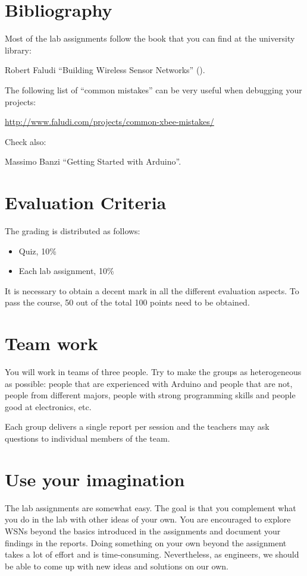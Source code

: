 \section{Bibliography}

Most of the lab assignments follow the book that you can find at the university library:

Robert Faludi ``Building Wireless Sensor Networks'' (\cite{faludi2010bws}).

The following list of ``common mistakes'' can be very useful when debugging your projects:

\url{http://www.faludi.com/projects/common-xbee-mistakes/}

Check also:

Massimo Banzi ``Getting Started with Arduino''.

\section{Evaluation Criteria}

The grading is distributed as follows:
\begin{itemize}
\item Quiz, 10\%
\item Each lab assignment, 10\%
\end{itemize}

It is necessary to obtain a decent mark in all the different evaluation aspects.
To pass the course, 50 out of the total 100 points need to be obtained.

\section{Team work}

You will work in teams of three people.
Try to make the groups as heterogeneous as possible: people that are experienced with Arduino and people that are not, people from different majors, people with strong programming skills and people good at electronics, etc.

Each group delivers a single report per session and the teachers may ask questions to individual members of the team.

\section{Use your imagination}
The lab assignments are somewhat easy.
The goal is that you complement what you do in the lab with other ideas of your own.
You are encouraged to explore WSNs beyond the basics introduced in the assignments and document your findings in the reports.
Doing something on your own beyond the assignment takes a lot of effort and is time-consuming.
Nevertheless, as engineers, we should be able to come up with new ideas and solutions on our own.

